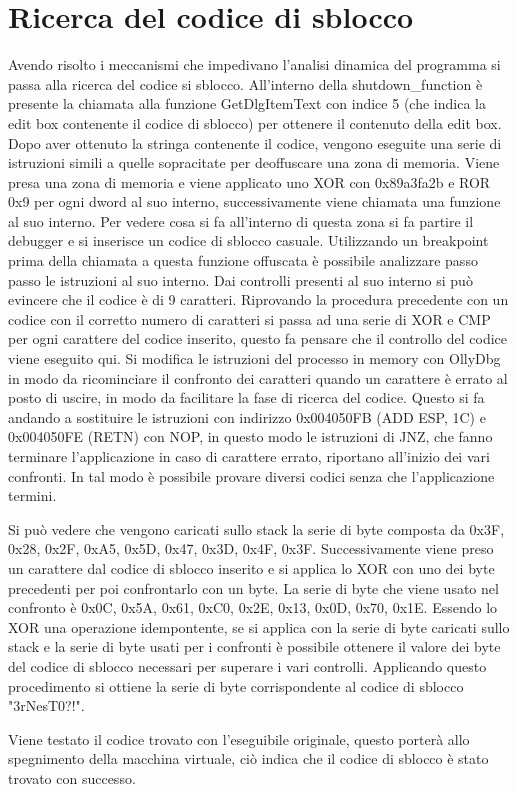 \documentclass[a4paper,12pt]{article}
\begin{document}
\section{Ricerca del codice di sblocco}
Avendo risolto i meccanismi che impedivano l'analisi dinamica del programma si passa alla ricerca del codice si sblocco. All'interno della shutdown\_function è presente la chiamata alla funzione GetDlgItemText con indice 5 (che indica la edit box contenente il codice di sblocco) per ottenere il contenuto della edit box. Dopo aver ottenuto la stringa  contenente il codice, vengono eseguite una serie di istruzioni simili a quelle sopracitate per deoffuscare una zona di memoria. Viene presa una zona di memoria e viene applicato uno XOR con 0x89a3fa2b e ROR 0x9 per ogni dword al suo interno, successivamente viene chiamata una funzione al suo interno. Per vedere cosa si fa all'interno di questa zona si fa partire il debugger e si inserisce un codice di sblocco casuale. Utilizzando un breakpoint prima della chiamata a questa funzione offuscata è possibile analizzare passo passo le istruzioni al suo interno. Dai controlli presenti al suo interno si può evincere che il codice è di 9 caratteri. Riprovando la procedura precedente con un codice con il corretto numero di caratteri si passa ad una serie di XOR e CMP per ogni carattere del codice inserito, questo fa pensare che il controllo del codice viene eseguito qui. Si modifica le istruzioni del processo in memory con OllyDbg in modo da ricominciare il confronto dei caratteri quando un carattere è errato al posto di uscire, in modo da facilitare la fase di ricerca del codice.  Questo si fa andando a sostituire le istruzioni con indirizzo 0x004050FB (ADD ESP, 1C) e 0x004050FE (RETN) con NOP, in questo modo le istruzioni di JNZ, che fanno terminare l'applicazione in caso di carattere errato, riportano all'inizio dei vari confronti.
In tal modo è possibile provare diversi codici senza che l'applicazione termini. 

Si può vedere che vengono caricati sullo stack la serie di byte composta da 0x3F, 0x28, 0x2F, 0xA5, 0x5D, 0x47, 0x3D, 0x4F, 0x3F. Successivamente viene preso un carattere dal codice di sblocco inserito e si applica lo XOR con uno dei byte precedenti per poi confrontarlo con un byte. La serie di byte che viene usato nel confronto è 0x0C, 0x5A, 0x61, 0xC0, 0x2E, 0x13, 0x0D, 0x70, 0x1E. Essendo lo XOR una operazione idempontente, se si applica con la serie di byte caricati sullo stack e la serie di byte usati per i confronti è possibile ottenere il valore dei byte del codice di sblocco necessari per superare i vari controlli. Applicando questo procedimento si ottiene la serie di byte corrispondente al codice di sblocco "3rNesT0?!". 

Viene testato il codice trovato con l'eseguibile originale, questo porterà allo spegnimento della macchina virtuale, ciò indica che il codice di sblocco è stato trovato con successo. 
\end{document}
